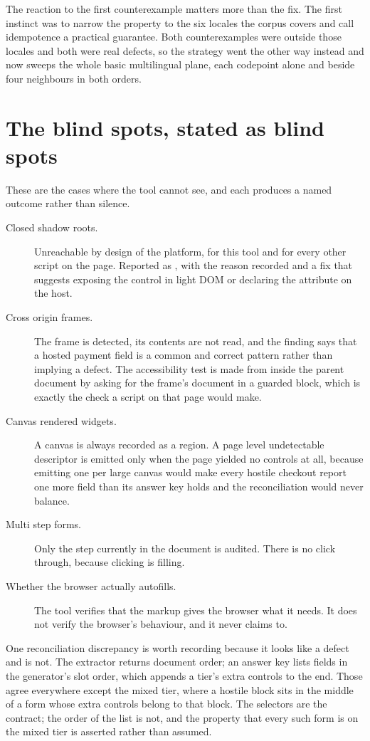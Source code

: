 The reaction to the first counterexample matters more than the fix. The first
instinct was to narrow the property to the six locales the corpus covers and
call idempotence a practical guarantee. Both counterexamples were outside those
locales and both were real defects, so the strategy went the other way instead
and now sweeps the whole basic multilingual plane, each codepoint alone and
beside four neighbours in both orders.

\section{The blind spots, stated as blind spots}

These are the cases where the tool cannot see, and each produces a named outcome
rather than silence.

\begin{description}
  \item[Closed shadow roots.] Unreachable by design of the platform, for this
    tool and for every other script on the page. Reported as
    , with the reason recorded and a fix that suggests
    exposing the control in light DOM or declaring the attribute on the host.
  \item[Cross origin frames.] The frame is detected, its contents are not read,
    and the finding says that a hosted payment field is a common and correct
    pattern rather than implying a defect. The accessibility test is made from
    inside the parent document by asking for the frame's document in a guarded
    block, which is exactly the check a script on that page would make.
  \item[Canvas rendered widgets.] A canvas is always recorded as a region. A
    page level undetectable descriptor is emitted only when the page yielded no
    controls at all, because emitting one per large canvas would make every
    hostile checkout report one more field than its answer key holds and the
    reconciliation would never balance.
  \item[Multi step forms.] Only the step currently in the document is audited.
    There is no click through, because clicking is filling.
  \item[Whether the browser actually autofills.] The tool verifies that the
    markup gives the browser what it needs. It does not verify the browser's
    behaviour, and it never claims to.
\end{description}

One reconciliation discrepancy is worth recording because it looks like a defect
and is not. The extractor returns document order; an answer key lists fields in
the generator's slot order, which appends a tier's extra controls to the end.
Those agree everywhere except the mixed tier, where a hostile block sits in the
middle of a form whose extra controls belong to that block. The selectors are
the contract; the order of the list is not, and the property that every such
form is on the mixed tier is asserted rather than assumed.

